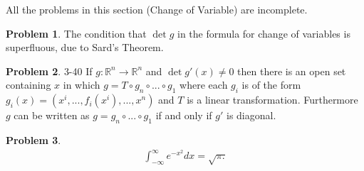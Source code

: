 \documentclass[20pt]{article}
\theoremstyle{plain}
\theoremstyle{definition}
\newtheorem*{problem}{Problem}
\newcommand{\reals}{\mathbb{R}}
\begin{document}
\color{Blue}
All the problems in this section (Change of Variable) are incomplete.
\color{Black}

\begin{problem}{3.39}
  The condition that $\det g$ in the formula for change of variables is
  superfluous, due to Sard's Theorem.
\end{problem}



\begin{problem}{3-40}
  If $g: \reals^n \to \reals^n$ and $\det g'(x) \neq 0$ then 
  there is an open set containing $x$ in which 
  $g = T \circ g_n \circ ... \circ g_1$ where each $g_i$
  is of the form $g_i(x) = (x^i, ..., f_i(x^i), ..., x^n)$
  and $T$ is a linear transformation.  Furthermore $g$ can be written as $g = g_n \circ...\circ g_1$ if and only if $g'$ is 
  diagonal.
\end{problem}

\begin{problem}
  \begin{align*}
    \int_{-\infty}^\infty e^{-x^2}dx = \sqrt{\pi.}
  \end{align*}
\end{problem}

\end{document}

